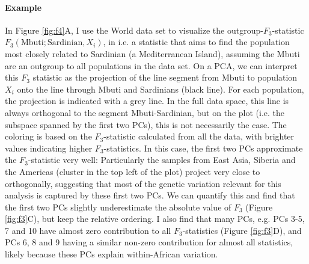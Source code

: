 \documentclass[12pt,fullpage, a4paper]{article}
\begin{document}
 
 




\paragraph{Example}
In Figure \ref{fig:f4}A, I use the World data set to visualize the outgroup-$F_3$-statistic $F_3(\text{Mbuti}; \text{Sardinian}, X_i)$, in i.e. a statistic that aims to find the population most closely related to Sardinian (a Mediterranean Island), assuming the Mbuti are an outgroup to all populations in the data set. On a PCA, we can interpret this $F_3$ statistic as the projection of the line segment from $\text{Mbuti}$ to population $X_i$ onto the line through Mbuti and Sardinians (black line). For each population, the projection is indicated with a grey line. In the full data space, this line is always orthogonal to the segment Mbuti-Sardinian, but on the plot (i.e. the subspace spanned by the first two PCs), this is not necessarily the case.  The coloring is based on the $F_3$-statistic calculated from all the data, with brighter values indicating higher $F_3$-statistics. In this case, the first two PCs approximate the $F_3$-statistic very well: Particularly the samples from East Asia, Siberia and the Americas (cluster in the top left of the plot) project very close to orthogonally, suggesting that most of the genetic variation relevant for this analysis is captured by these first two PCs.  We can quantify this and find that the first two PCs slightly underestimate the absolute value of $F_3$ (Figure \ref{fig:f3}C), but keep the relative ordering. I also find that many PCs, e.g. PCs 3-5, 7 and 10 have almost zero contribution to all $F_3$-statistics (Figure \ref{fig:f3}D), and PCs 6, 8 and 9 having a similar non-zero contribution for almost all statistics, likely because these PCs explain within-African variation.
\end{document}
